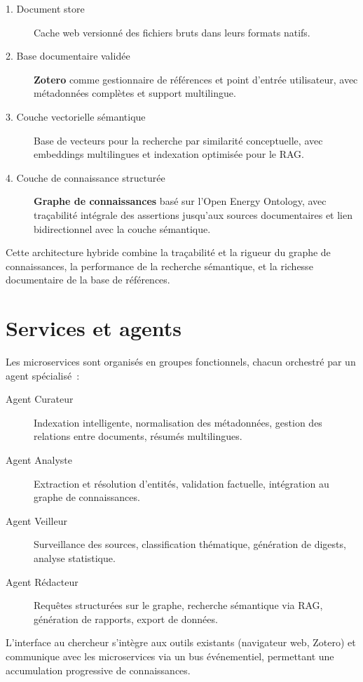 \documentclass[a4paper,11pt]{report}
\begin{document}
\begin{description}
\item[1. Document store] Cache web versionné des fichiers bruts dans leurs formats natifs.
\item[2. Base documentaire validée] \textbf{Zotero} comme gestionnaire de références et point d'entrée utilisateur, avec métadonnées complètes et support multilingue.
\item[3. Couche vectorielle sémantique] Base de vecteurs pour la recherche par similarité conceptuelle, avec embeddings multilingues et indexation optimisée pour le RAG.
\item[4. Couche de connaissance structurée] \textbf{Graphe de connaissances} basé sur l'Open Energy Ontology, avec traçabilité intégrale des assertions jusqu'aux sources documentaires et lien bidirectionnel avec la couche sémantique.
\end{description}

Cette architecture hybride combine la traçabilité et la rigueur du graphe de connaissances, la performance de la recherche sémantique, et la richesse documentaire de la base de références.

\section{Services et agents}

Les microservices sont organisés en groupes fonctionnels, chacun orchestré par un agent spécialisé~:

\begin{description}
\item[Agent Curateur] Indexation intelligente, normalisation des métadonnées, gestion des relations entre documents, résumés multilingues.
\item[Agent Analyste] Extraction et résolution d'entités, validation factuelle, intégration au graphe de connaissances.
\item[Agent Veilleur] Surveillance des sources, classification thématique, génération de digests, analyse statistique.
\item[Agent Rédacteur] Requêtes structurées sur le graphe, recherche sémantique via RAG, génération de rapports, export de données.
\end{description}

L'interface au chercheur s'intègre aux outils existants (navigateur web, Zotero) et communique avec les microservices via un bus événementiel, permettant une accumulation progressive de connaissances.
\end{document}
